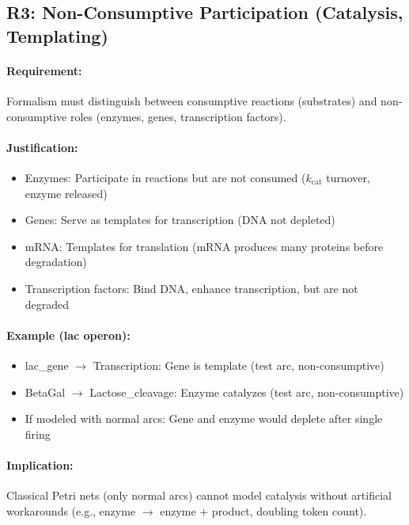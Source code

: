 \subsection{R3: Non-Consumptive Participation (Catalysis, Templating)}
\label{subsec:r3-nonconsumptive}

\paragraph{Requirement:} Formalism must distinguish between consumptive reactions (substrates) and non-consumptive roles (enzymes, genes, transcription factors).

\paragraph{Justification:}
\begin{itemize}
    \item Enzymes: Participate in reactions but are not consumed ($k_{\text{cat}}$ turnover, enzyme released)
    \item Genes: Serve as templates for transcription (DNA not depleted)
    \item mRNA: Templates for translation (mRNA produces many proteins before degradation)
    \item Transcription factors: Bind DNA, enhance transcription, but are not degraded
\end{itemize}

\paragraph{Example (lac operon):}
\begin{itemize}
    \item lac\_gene $\to$ Transcription: Gene is template (test arc, non-consumptive)
    \item BetaGal $\to$ Lactose\_cleavage: Enzyme catalyzes (test arc, non-consumptive)
    \item If modeled with normal arcs: Gene and enzyme would deplete after single firing \texttimes
\end{itemize}

\paragraph{Implication:} Classical Petri nets (only normal arcs) cannot model catalysis without artificial workarounds (e.g., enzyme $\to$ enzyme + product, doubling token count).

